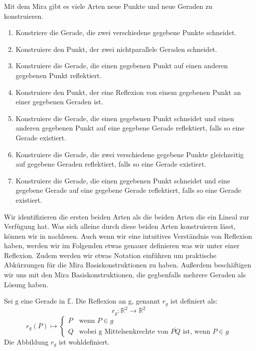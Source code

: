 \begin{remark}
    \label{rem:mira}
    Mit dem Mira gibt es viele Arten neue Punkte und neue Geraden  zu konstruieren.
    \begin{enumerate}[label=\roman*.]
        \item Konstriere die Gerade, die zwei verschiedene gegebene Punkte schneidet.
        \item Konstruiere den Punkt, der zwei nichtparallele Geraden schneidet.
        \item Konstruiere die Gerade, die einen gegebenen Punkt auf einen anderen gegebenen Punkt reflektiert.
        \item Konstruiere den Punkt, der eine Reflexion von einem gegebenen Punkt an einer gegebenen Geraden ist.
        \item Konstruiere die Gerade, die einen gegebenen Punkt schneidet und einen anderen gegebenen Punkt auf eine gegebene Gerade reflektiert, falls so eine Gerade existiert.
        \item Konstruiere die Gerade, die zwei verschiedene gegebene Punkte gleichzeitig auf gegebene Geraden reflektiert, falls so eine Gerade existiert.
        \item Konstruiere die Gerade, die einen gegebenen Punkt schneidet und eine gegebene Gerade auf eine gegebene Gerade reflektiert, falls so eine Gerade existiert.
    \end{enumerate}

    Wir identifizieren die ersten beiden Arten als die beiden Arten die ein Lineal zur Verfügung hat.
    Was sich alleine durch diese beiden Arten konstruieren lässt, können wir in \cite{Vogel} nachlesen.
    Auch wenn wir eine intuitives Verständnis von Reflexion haben, werden wir im Folgenden etwas genauer definieren was wir unter einer Reflexion. Zudem werden wir etwas Notation einführen um praktische Abkürzungen für die Mira Basiskonstruktionen zu haben. Außerdem beschäftigen wir uns mit den Mira Basiskonstruktionen, die gegbenfalls mehrere Geraden als Lösung haben.
\end{remark}
\begin{definition}
    \label{def:reflexion}
    Sei g eine Gerade in $\mathbb{E}$. Die Reflexion an g, genannt $r_g$ ist definiert als:
    $$r_g: \mathbb{R}^2 \longrightarrow \mathbb{R}^2$$
    $$r_g(P) \longmapsto \begin{cases}
    P & \text{wenn } P \in g \\
    Q & \text{wobei g Mittelsenkrechte von } \overline{PQ} \text{ ist, wenn } P \in g
    \end{cases}
    $$
    Die Abbildung $r_g$ ist wohldefiniert.
\end{definition}

